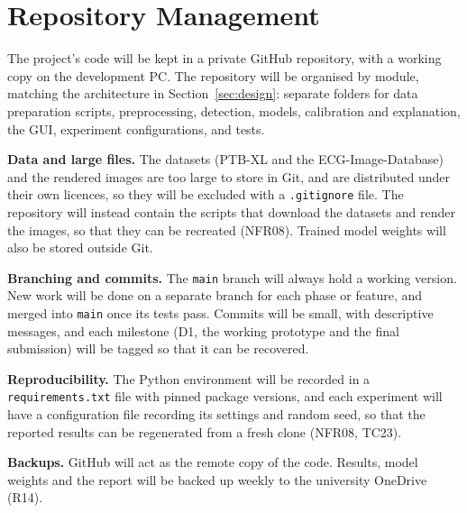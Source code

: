 \section{Repository Management}
\label{app:repo}

The project's code will be kept in a private GitHub repository, with a working copy on the development PC. The repository will be organised by module, matching the architecture in Section~\ref{sec:design}: separate folders for data preparation scripts, preprocessing, detection, models, calibration and explanation, the GUI, experiment configurations, and tests.

\textbf{Data and large files.} The datasets (PTB-XL and the ECG-Image-Database) and the rendered images are too large to store in Git, and are distributed under their own licences, so they will be excluded with a \texttt{.gitignore} file. The repository will instead contain the scripts that download the datasets and render the images, so that they can be recreated (NFR08). Trained model weights will also be stored outside Git.

\textbf{Branching and commits.} The \texttt{main} branch will always hold a working version. New work will be done on a separate branch for each phase or feature, and merged into \texttt{main} once its tests pass. Commits will be small, with descriptive messages, and each milestone (D1, the working prototype and the final submission) will be tagged so that it can be recovered.

\textbf{Reproducibility.} The Python environment will be recorded in a \texttt{requirements.txt} file with pinned package versions, and each experiment will have a configuration file recording its settings and random seed, so that the reported results can be regenerated from a fresh clone (NFR08, TC23).

\textbf{Backups.} GitHub will act as the remote copy of the code. Results, model weights and the report will be backed up weekly to the university OneDrive (R14).

